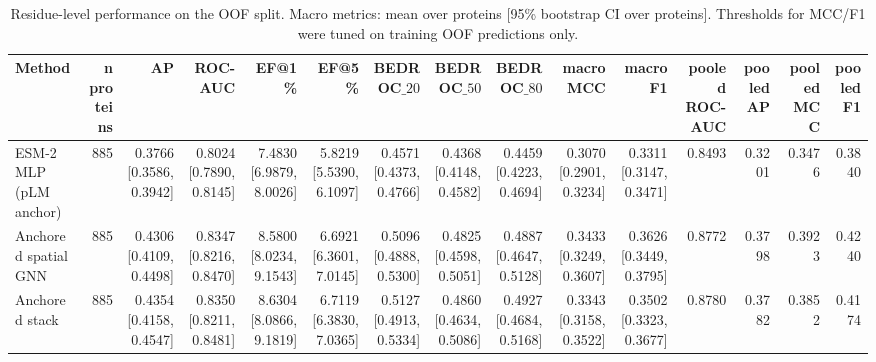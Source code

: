\begin{table}[t]
\centering
\small
\caption{Residue-level performance on the OOF split. Macro metrics: mean over proteins [95\% bootstrap CI over proteins]. Thresholds for MCC/F1 were tuned on training OOF predictions only.}
\label{tab:table1_performance_oof}
\begin{tabular}{lrrrrrrrrrrrrrr}
\toprule
Method & n proteins & AP & ROC-AUC & EF@1\% & EF@5\% & BEDROC$\_{20}$ & BEDROC$\_{50}$ & BEDROC$\_{80}$ & macro MCC & macro F1 & pooled ROC-AUC & pooled AP & pooled MCC & pooled F1 \\
\midrule
ESM-2 MLP (pLM anchor) & 885 & 0.3766 [0.3586, 0.3942] & 0.8024 [0.7890, 0.8145] & 7.4830 [6.9879, 8.0026] & 5.8219 [5.5390, 6.1097] & 0.4571 [0.4373, 0.4766] & 0.4368 [0.4148, 0.4582] & 0.4459 [0.4223, 0.4694] & 0.3070 [0.2901, 0.3234] & 0.3311 [0.3147, 0.3471] & 0.8493 & 0.3201 & 0.3476 & 0.3840 \\
Anchored spatial GNN & 885 & 0.4306 [0.4109, 0.4498] & 0.8347 [0.8216, 0.8470] & 8.5800 [8.0234, 9.1543] & 6.6921 [6.3601, 7.0145] & 0.5096 [0.4888, 0.5300] & 0.4825 [0.4598, 0.5051] & 0.4887 [0.4647, 0.5128] & 0.3433 [0.3249, 0.3607] & 0.3626 [0.3449, 0.3795] & 0.8772 & 0.3798 & 0.3923 & 0.4240 \\
Anchored stack & 885 & 0.4354 [0.4158, 0.4547] & 0.8350 [0.8211, 0.8481] & 8.6304 [8.0866, 9.1819] & 6.7119 [6.3830, 7.0365] & 0.5127 [0.4913, 0.5334] & 0.4860 [0.4634, 0.5086] & 0.4927 [0.4684, 0.5168] & 0.3343 [0.3158, 0.3522] & 0.3502 [0.3323, 0.3677] & 0.8780 & 0.3782 & 0.3852 & 0.4174 \\
\bottomrule
\end{tabular}
\end{table}
